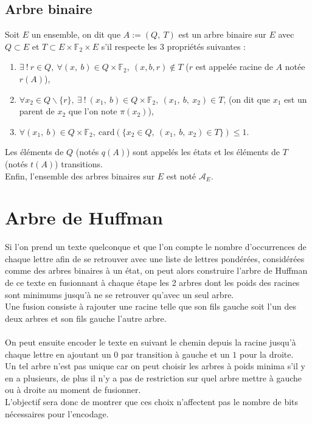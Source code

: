 \documentclass[a4paper, 12pt]{article}
\begin{document}
\subsection{Arbre binaire}
Soit $E$ un ensemble, on dit que $A := (Q,\ T)$ est un arbre binaire sur $E$ avec $Q \subset E$ et $T \subset E\times \mathbb{F}_2\times E$ s'il respecte les 3 propriétés suivantes :
\begin{enumerate}
\item $\exists \ !\ r \in Q,\ \forall (x,\ b) \in Q\times \mathbb{F}_2,\ (x, b, r) \notin T$ ($r$ est appelée racine de $A$ notée $r(A)$),
\item $\forall x_2 \in Q\backslash\{r\},\ \exists \ !\ (x_1,\ b) \in Q\times \mathbb{F}_2,\ (x_1,\ b,\ x_2) \in T$, (on dit que $x_1$ est un parent de $x_2$ que l'on note $\pi(x_2)$),
\item $\forall (x_1,\ b) \in Q\times \mathbb{F}_2,\ \text{card}(\{x_2 \in Q,\ (x_1,\ b,\ x_2)\in T\}) \leq 1$.
\end{enumerate}
Les éléments de $Q$ (notés $q(A)$) sont appelés les états et les éléments de $T$ (notés $t(A)$) transitions. \\
Enfin, l'ensemble des arbres binaires sur $E$ est noté $\mathcal{A}_E$.
\newpage

\section{Arbre de Huffman}

Si l'on prend un texte quelconque et que l'on compte le nombre d'occurrences de chaque lettre afin de se retrouver avec une liste de lettres pondérées, considérées comme des arbres binaires à un état, on peut alors construire l'arbre de Huffman de ce texte en fusionnant à chaque étape les 2 arbres dont les poids des racines sont minimums jusqu'à ne se retrouver qu'avec un seul arbre. \\
Une fusion consiste à rajouter une racine telle que son fils gauche soit l'un des deux arbres et son fils gauche l'autre arbre. \\ \\
On peut ensuite encoder le texte en suivant le chemin depuis la racine jusqu'à chaque lettre en ajoutant un $0$ par transition à gauche et un $1$ pour la droite. \\
Un tel arbre n'est pas unique car on peut choisir les arbres à poids minima s'il y en a plusieurs, de plus il n'y a pas de restriction sur quel arbre mettre à gauche ou à droite au moment de fusionner. \\
L'objectif sera donc de montrer que ces choix n'affectent pas le nombre de bits nécessaires pour l'encodage.
\end{document}
